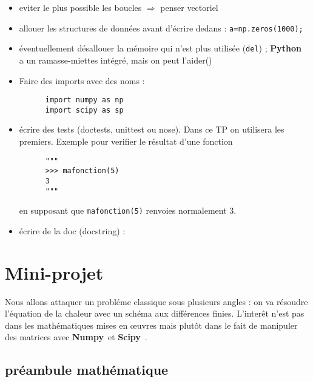 \documentclass[11pt]{article}
\def\mysmile#1{{\ooalign{\hfil\lower.06ex %
 \hbox{$\scriptscriptstyle#1$}\hfil\crcr
 \hfil\lower.7ex\hbox{\"{}}\hfil\crcr
 \mathhexbox20D}}}
\newcommand{\good}{\bf \textcolor{green}{\mysmile \smile}}
\newcommand{\python}{{\bf Python}\ }
\newcommand{\numpy}{{\bf Numpy}\ }
\newcommand{\scipy}{{\bf Scipy}\ }
\begin{document}
\begin{itemize}
\begin{itemize}
      \item eviter le plus possible les boucles $\Rightarrow$ penser vectoriel
      \item allouer les structures de données avant d'écrire dedans : \lstinline!a=np.zeros(1000);!
      \item éventuellement désallouer la mémoire qui n'est plus utilisée ({\tt del}) ; \python 
      a un ramasse-miettes intégré, mais on peut l'aider({\good})
      \item Faire des imports avec des noms : 
      \begin{lstlisting}
      import numpy as np
      import scipy as sp
      \end{lstlisting}
      \item écrire des tests (doctests, unittest ou nose). Dans ce TP on utilisera les premiers. Exemple pour verifier le résultat d'une fonction
      \begin{lstlisting}
      """
      >>> mafonction(5)
      3
      """
      \end{lstlisting}
      en supposant que {\tt mafonction(5)} renvoies normalement 3.

      \item écrire de la doc (docstring) :  

    \end{itemize}

\section{Mini-projet}

   Nous allons attaquer un probléme classique sous plusieurs angles : on va résoudre l'équation de la chaleur avec
   un schéma aux différences finies. L'interêt n'est pas dans les mathématiques mises en \oe uvres mais plutôt
   dans le fait de  manipuler des matrices avec \numpy et \scipy.

   \subsection{préambule mathématique}
    

\end{itemize}
\end{document}
